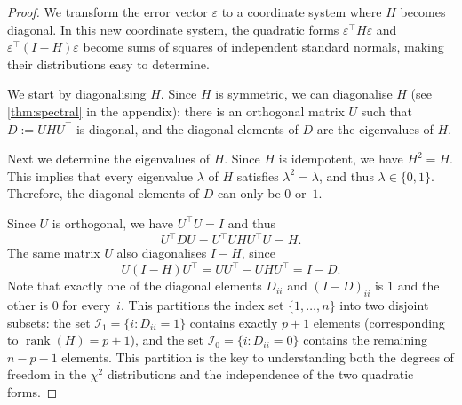 \documentclass[
  a4paper,
]{article}
\theoremstyle{definition}
\theoremstyle{definition}
\theoremstyle{definition}
\theoremstyle{definition}
\theoremstyle{remark}
\begin{document}
\begin{proof}
We transform the error vector \(\varepsilon\) to a coordinate system where \(H\)
becomes diagonal. In this new coordinate system, the quadratic forms
\(\varepsilon^\top H \varepsilon\) and \(\varepsilon^\top (I-H) \varepsilon\) become sums of squares of
independent standard normals, making their distributions easy to determine.

We start by diagonalising \(H\).
Since \(H\) is symmetric, we can diagonalise \(H\) (see \ref{thm:spectral}
in the appendix): there is an orthogonal matrix \(U\) such that
\(D := U H U^\top\) is diagonal, and the diagonal elements of \(D\) are
the eigenvalues of \(H\).

Next we determine the eigenvalues of \(H\).
Since \(H\) is idempotent, we have \(H^2 = H\). This implies that every
eigenvalue \(\lambda\) of \(H\) satisfies \(\lambda^2 = \lambda\), and thus
\(\lambda \in \{0, 1\}\). Therefore, the diagonal elements of \(D\)
can only be \(0\) or~\(1\).

Since \(U\) is orthogonal, we have \(U^\top U = I\) and thus
\begin{equation*}
  U^\top D U
  = U^\top U H U^\top U
  = H.
\end{equation*}
The same matrix \(U\) also diagonalises \(I-H\), since
\begin{equation*}
  U (I -H) U^\top = U U^\top - U H U^\top = I - D.
\end{equation*}
Note that exactly one of the diagonal elements \(D_{ii}\) and \((I - D)_{ii}\)
is \(1\) and the other is \(0\) for every~\(i\). This partitions the index set
\(\{1, \ldots, n\}\) into two disjoint subsets: the set \(\mathcal{I}_1 = \{ i : D_{ii} = 1 \}\)
contains exactly \(p+1\) elements (corresponding to \(\mathop{\mathrm{rank}}(H) = p+1\)), and the
set \(\mathcal{I}_0 = \{ i : D_{ii} = 0 \}\) contains the remaining \(n - p - 1\)
elements. This partition is the key to understanding both the degrees of
freedom in the \(\chi^2\) distributions and the independence of the two quadratic forms.


\end{proof}
\end{document}
